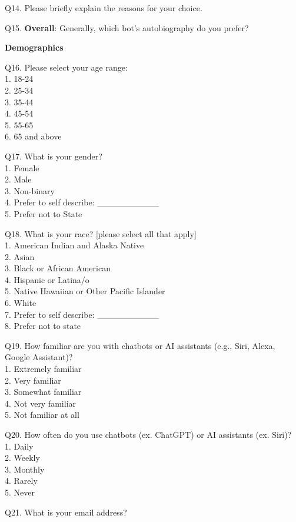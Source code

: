 \begin{mdframed}
\noindent Q14. Please briefly explain the reasons for your choice.

\noindent Q15. \textbf{Overall}: Generally, which bot’s autobiography do you prefer?

\noindent\textbf{Demographics}

\noindent Q16. Please select your age range:\\
1. 18-24\\
2. 25-34\\
3. 35-44\\
4. 45-54\\
5. 55-65\\
6. 65 and above

\noindent Q17. What is your gender?\\
1. Female\\
2. Male\\
3. Non-binary\\
4. Prefer to self describe: \_\_\_\_\_\_\_\_\_\_ \\
5. Prefer not to State
 
\noindent Q18. What is your race? [please select all that apply]\\
1. American Indian and Alaska Native\\
2. Asian\\
3. Black or African American\\
4. Hispanic or Latina/o\\
5. Native Hawaiian or Other Pacific Islander\\
6. White\\
7. Prefer to self describe: \_\_\_\_\_\_\_\_\_\_ \\
8. Prefer not to state

\noindent Q19. How familiar are you with chatbots or AI assistants (e.g., Siri, Alexa, Google Assistant)? \\
1. Extremely familiar\\
2. Very familiar\\
3. Somewhat familiar\\
4. Not very familiar\\
5. Not familiar at all
 
\noindent Q20. How often do you use chatbots (ex. ChatGPT) or AI assistants (ex. Siri)? \\
1. Daily \\
2. Weekly \\
3. Monthly \\
4. Rarely \\
5. Never

\noindent Q21. What is your email address?

\end{mdframed}

